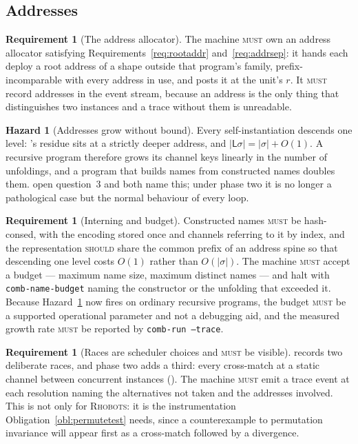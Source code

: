 \documentclass[11pt,a4paper]{article}
\newcommand{\code}[1]{\texttt{#1}}
\newcommand{\Rhobots}{\textsc{Rhobots}}
\newcommand{\MUST}{\textsc{must}}
\newcommand{\SHOULD}{\textsc{should}}
\newcommand{\Lft}{\mathsf{L}}
\theoremstyle{definition}
\newtheorem{requirement}[definition]{Requirement}
\newtheorem{hazard}[definition]{Hazard}
\theoremstyle{plain}
\begin{document}
\subsection{Addresses}

\begin{requirement}[The address allocator]\label{req:allocator}
The machine \MUST{} own an address allocator satisfying
Requirements~\ref{req:rootaddr} and~\ref{req:addrsep}: it hands each deploy a
root address of a shape outside that program's family, prefix-incomparable
with every address in use, and posts it at the unit's $r$. It \MUST{} record
addresses in the event stream, because an address is the only thing that
distinguishes two instances and a trace without them is unreadable.
\end{requirement}

\begin{hazard}[Addresses grow without bound]\label{haz:growth}
Every self-instantiation descends one level: \cite[Ex.~6.9]{draft3}'s residue
sits at a strictly deeper address, and $|\Lft\sigma| = |\sigma| + O(1)$. A
recursive program therefore grows its channel keys linearly in the number of
unfoldings, and a program that builds names from constructed names doubles
them. \cite[\S12]{draft3} open question~3 and \cite[\S7]{logic} both name
this; under phase two it is no longer a pathological case but the normal
behaviour of every loop.
\end{hazard}

\begin{requirement}[Interning and budget]\label{req:intern}
Constructed names \MUST{} be hash-consed, with the encoding stored once and
channels referring to it by index, and the representation \SHOULD{} share the
common prefix of an address spine so that descending one level costs $O(1)$
rather than $O(|\sigma|)$. The machine \MUST{} accept a budget --- maximum
name size, maximum distinct names --- and halt with
\code{comb-name-budget} naming the constructor or the unfolding that exceeded
it. Because Hazard~\ref{haz:growth} now fires on ordinary recursive programs,
the budget \MUST{} be a supported operational parameter and not a debugging
aid, and the measured growth rate \MUST{} be reported by
\code{comb-run --trace}.
\end{requirement}

\begin{requirement}[Races are scheduler choices and \MUST{} be visible]
\label{req:races}
\cite[\S3.3]{draft3} records two deliberate races, and phase two adds a third:
every cross-match at a static channel between concurrent instances
(\cite[Rem.~6.10]{draft3}). The machine \MUST{} emit a trace event at each
resolution naming the alternatives not taken and the addresses involved. This
is not only for \Rhobots: it is the instrumentation
Obligation~\ref{obl:permutetest} needs, since a counterexample to permutation
invariance will appear first as a cross-match followed by a divergence.
\end{requirement}
\end{document}
